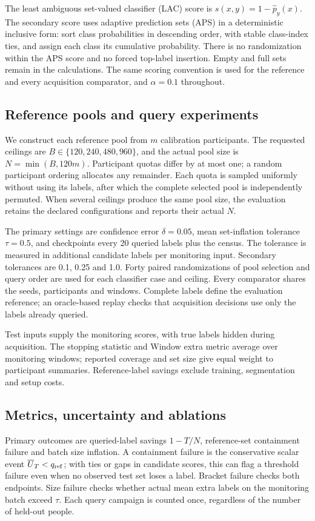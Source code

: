 \documentclass[preprint,12pt]{elsarticle}
\begin{document}
The least ambiguous set-valued classifier (LAC) score \cite{sadinle} is $s(x,y)=1-\widehat p_y(x)$. The secondary score uses adaptive prediction sets (APS) \cite{romano} in a deterministic inclusive form: sort class probabilities in descending order, with stable class-index ties, and assign each class its cumulative probability. There is no randomization within the APS score and no forced top-label insertion. Empty and full sets remain in the calculations. The same scoring convention is used for the reference and every acquisition comparator, and $\alpha=0.1$ throughout.

\subsection{Reference pools and query experiments}
\noindent We construct each reference pool from $m$ calibration participants. The requested ceilings are $B\in\{120,240,480,960\}$, and the actual pool size is $N=\min(B,120m)$. Participant quotas differ by at most one; a random participant ordering allocates any remainder. Each quota is sampled uniformly without using its labels, after which the complete selected pool is independently permuted. When several ceilings produce the same pool size, the evaluation retains the declared configurations and reports their actual $N$.

The primary settings are confidence error $\delta=0.05$, mean set-inflation tolerance $\tau=0.5$, and checkpoints every 20 queried labels plus the census. The tolerance is measured in additional candidate labels per monitoring input. Secondary tolerances are 0.1, 0.25 and 1.0. Forty paired randomizations of pool selection and query order are used for each classifier case and ceiling. Every comparator shares the seeds, participants and windows. Complete labels define the evaluation reference; an oracle-based replay checks that acquisition decisions use only the labels already queried.

Test inputs supply the monitoring scores, with true labels hidden during acquisition. The stopping statistic and Window extra metric average over monitoring windows; reported coverage and set size give equal weight to participant summaries. Reference-label savings exclude training, segmentation and setup costs.

\subsection{Metrics, uncertainty and ablations}
Primary outcomes are queried-label savings $1-T/N$, reference-set containment failure and batch size inflation. A containment failure is the conservative scalar event $\overline U_T<q_{\rm ref}$; with ties or gaps in candidate scores, this can flag a threshold failure even when no observed test set loses a label. Bracket failure checks both endpoints. Size failure checks whether actual mean extra labels on the monitoring batch exceed $\tau$. Each query campaign is counted once, regardless of the number of held-out people.
\end{document}
